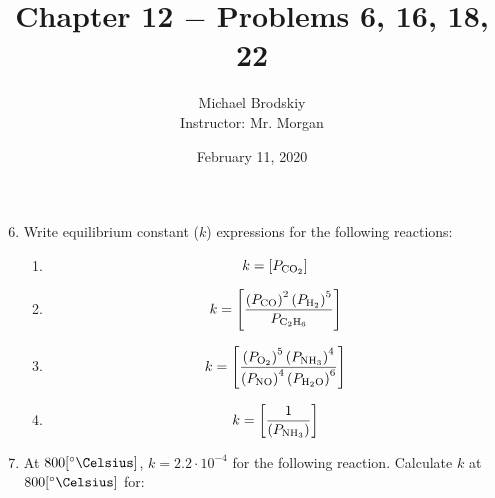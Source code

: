 \documentclass[12pt]{article}
\title{Chapter 12 $-$ Problems 6, 16, 18, 22}
\date{February 11, 2020}
\author{Michael Brodskiy\\ \small Instructor: Mr. Morgan}
\begin{document}
\maketitle

\begin{enumerate}

    \setcounter{enumi}{5}

  \item Write equilibrium constant ($k$) expressions for the following reactions:

    \begin{enumerate}

      \item {}

        \begin{equation}
          k=[P_{\ce{CO2}}]
          \label{1}
        \end{equation}

      \item {}

        \begin{equation}
          k=\left[ \frac{\left( P_{\ce{CO}} \right)^2\left( P_{\ce{H2}} \right)^5}{P_{\ce{C2H6}}} \right]
          \label{2}
        \end{equation}

      \item {}

        \begin{equation}
          k=\left[ \frac{\left( P_{\ce{O2}} \right)^5\left( P_{\ce{NH3}} \right)^4}{\left(P_{\ce{NO}}\right)^4\left( P_{\ce{H2O}} \right)^6} \right]
          \label{3}
        \end{equation}

      \item {}

        \begin{equation}
          k=\left[ \frac{1}{\left( P_{\ce{NH3}} \right)} \right]
          \label{4}
        \end{equation}

    \end{enumerate}

    \setcounter{enumi}{15}

  \item At $800[\si{\degree\Celsius}]$, $k=2.2\cdot10^{-4}$ for the following reaction. Calculate $k$ at $800[\si{\degree\Celsius}]$ for:


\end{enumerate}
\end{document}
